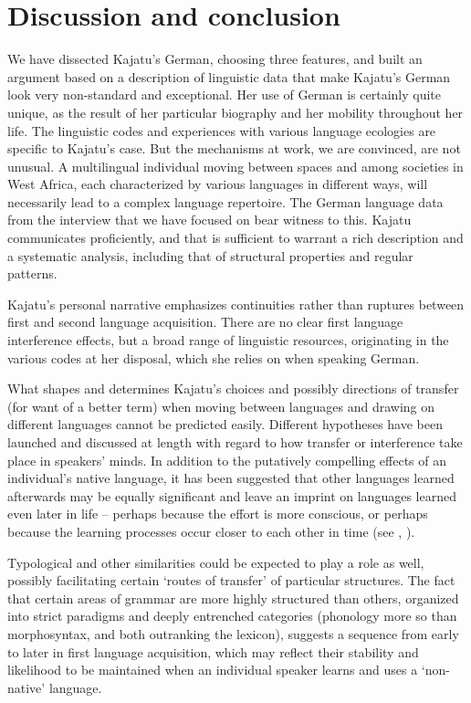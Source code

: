 \documentclass[output=paper]{langscibook}
\begin{document}
\section{Discussion and conclusion}\label{fanego:sec:6}
We have dissected Kajatu’s German, choosing three features, and built an argument based on a description of linguistic data that make Kajatu’s German look very non-standard and exceptional. Her use of German is certainly quite unique, as the result of her particular biography and her mobility throughout her life. The linguistic codes and experiences with various language ecologies are specific to Kajatu’s case. But the mechanisms at work, we are convinced, are not unusual. A multilingual individual moving between spaces and among societies in West Africa, each characterized by various languages in different ways, will necessarily lead to a complex language repertoire. The German language data from the interview that we have focused on bear witness to this. Kajatu communicates proficiently, and that is sufficient to warrant a rich description and a systematic analysis, including that of structural properties and regular patterns. 

Kajatu’s personal narrative emphasizes continuities rather than ruptures between first and second language acquisition. There are no clear first language interference effects, but a broad range of linguistic resources, originating in the various codes at her disposal, which she relies on when speaking German. 

What shapes and determines Kajatu’s choices and possibly directions of transfer (for want of a better term) when moving between languages and drawing on different languages cannot be predicted easily. Different hypotheses have been launched and discussed at length with regard to how transfer or interference take place in speakers’ minds. In addition to the putatively compelling effects of an individual’s native language, it has been suggested that other languages learned afterwards may be equally significant and leave an imprint on languages learned even later in life – perhaps because the effort is more conscious, or perhaps because the learning processes occur closer to each other in time (see \citealt{vildomec_multilingualism_1963}, \citealt[154]{gass_second_2008}).

Typological and other similarities could be expected to play a role as well, possibly facilitating certain ‘routes of transfer’ of particular structures. The fact that certain areas of grammar are more highly structured than others, organized into strict paradigms and deeply entrenched categories (phonology more so than morphosyntax, and both outranking the lexicon), suggests a sequence from early to later in first language acquisition, which may reflect their stability and likelihood to be maintained when an individual speaker learns and uses a ‘non-native’ language. 
\end{document}
